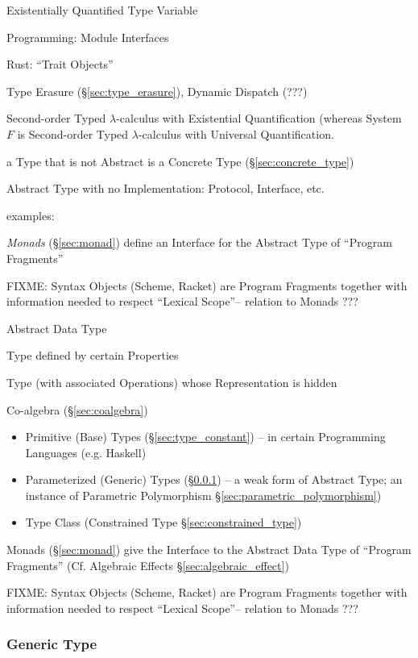 Existentially Quantified Type Variable

Programming: Module Interfaces

Rust: ``Trait Objects''

Type Erasure (\S\ref{sec:type_erasure}), Dynamic Dispatch (???)

Second-order Typed $\lambda$-calculus with Existential Quantification
(whereas System $F$ is Second-order Typed $\lambda$-calculus with
Universal Quantification.

a Type that is not Abstract is a Concrete Type
(\S\ref{sec:concrete_type})

Abstract Type with no Implementation: Protocol, Interface, etc.

examples:

\emph{Monads} (\S\ref{sec:monad}) define an Interface for the Abstract
Type of ``Program Fragments''

FIXME: Syntax Objects (Scheme, Racket) are Program Fragments together
with information needed to respect ``Lexical Scope''-- relation to
Monads ???


\asterism


Abstract Data Type

Type defined by certain Properties %

Type (with associated Operations) whose Representation is hidden

Co-algebra (\S\ref{sec:coalgebra})

\begin{itemize}
  \item Primitive (Base) Types (\S\ref{sec:type_constant}) -- in
    certain Programming Languages (e.g. Haskell)
  \item Parameterized (Generic) Types (\S\ref{sec:generic_type}) -- a
    weak form of Abstract Type; an instance of Parametric Polymorphism
    \S\ref{sec:parametric_polymorphism})
  \item Type Class (Constrained Type \S\ref{sec:constrained_type})
\end{itemize}

Monads (\S\ref{sec:monad}) give the Interface to the Abstract Data
Type of ``Program Fragments'' (\fist Cf. Algebraic Effects
\S\ref{sec:algebraic_effect})

FIXME: Syntax Objects (Scheme, Racket) are Program Fragments together
with information needed to respect ``Lexical Scope''-- relation to
Monads ???


\subsubsection{Generic Type}\label{sec:generic_type}

